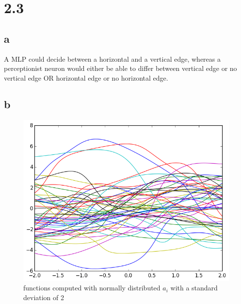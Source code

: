 \documentclass[11pt,a4paper]{article}
\begin{document}
\section*{2.3}
\subsection*{a}
A MLP could decide between a horizontal and a vertical edge, whereas a perceptionist neuron would either be able to differ between
vertical edge or no vertical edge OR horizontal edge or no horizontal edge.
\subsection*{b}
\begin{figure}[h]
\centering
 \includegraphics[width=\textwidth]{./2_3_std=2.png}
\caption{functions computed with normally distributed $a_i$ with a standard deviation of 2}
\end{figure}
\newpage
\end{document}
